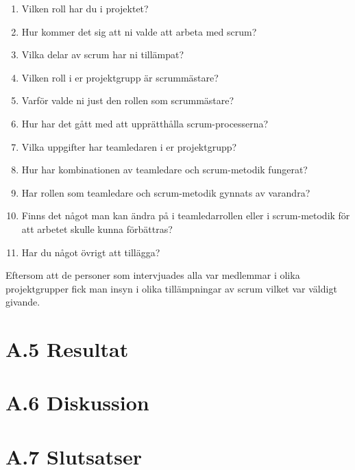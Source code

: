 \begin{enumerate}

\item Vilken roll har du i projektet?

\item Hur kommer det sig att ni valde att arbeta med scrum?

\item Vilka delar av scrum har ni tillämpat?

\item Vilken roll i er projektgrupp är scrummästare?

\item Varför valde ni just den rollen som scrummästare?

\item Hur har det gått med att upprätthålla scrum-processerna?

\item Vilka uppgifter har teamledaren i er projektgrupp?

\item Hur har kombinationen av teamledare och scrum-metodik fungerat?

\item Har rollen som teamledare och scrum-metodik gynnats av varandra?

\item Finns det något man kan ändra på i teamledarrollen eller i scrum-metodik för att arbetet skulle kunna förbättras?

\item Har du något övrigt att tillägga?

\end{enumerate}

Eftersom att de personer som intervjuades alla var medlemmar i olika projektgrupper fick man insyn i olika tillämpningar av scrum vilket var väldigt givande.

\section{A.5 Resultat}

\section{A.6 Diskussion}

\section{A.7 Slutsatser}

